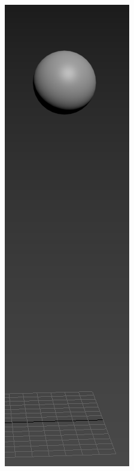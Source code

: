 \documentclass{article}
\begin{document}
\begin{figure}[H]
\begin{subfigure}[H]{0.15\textwidth}
	    \includegraphics[width=\textwidth]{imagenes/Ejercicio 2/p2.png}

\end{subfigure}
\end{figure}
\end{document}
